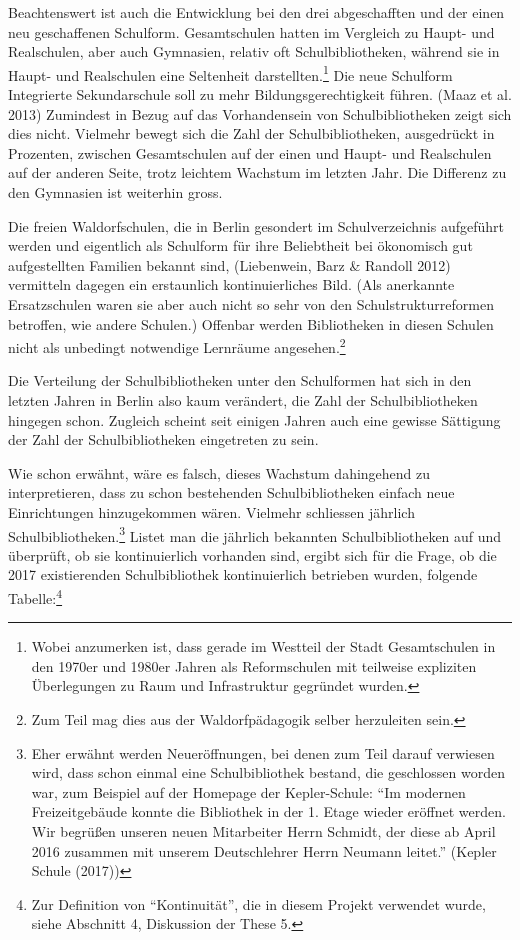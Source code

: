 \documentclass[a4paper,
fontsize=11pt,
oneside,
numbers=noperiodatend,
parskip=half-,
bibliography=totoc,
final
]{scrartcl}
\begin{document}
Beachtenswert ist auch die Entwicklung bei den drei abgeschafften und
der einen neu geschaffenen Schulform. Gesamtschulen hatten im Vergleich
zu Haupt- und Realschulen, aber auch Gymnasien, relativ oft
Schulbibliotheken, während sie in Haupt- und Realschulen eine Seltenheit
darstellten.\footnote{Wobei anzumerken ist, dass gerade im Westteil der
  Stadt Gesamtschulen in den 1970er und 1980er Jahren als Reformschulen
  mit teilweise expliziten Überlegungen zu Raum und Infrastruktur
  gegründet wurden.} Die neue Schulform Integrierte Sekundarschule soll
zu mehr Bildungsgerechtigkeit führen. (Maaz et al. 2013) Zumindest in
Bezug auf das Vorhandensein von Schulbibliotheken zeigt sich dies nicht.
Vielmehr bewegt sich die Zahl der Schulbibliotheken, ausgedrückt in
Prozenten, zwischen Gesamtschulen auf der einen und Haupt- und
Realschulen auf der anderen Seite, trotz leichtem Wachstum im letzten
Jahr. Die Differenz zu den Gymnasien ist weiterhin gross.

Die freien Waldorfschulen, die in Berlin gesondert im Schulverzeichnis
aufgeführt werden und eigentlich als Schulform für ihre Beliebtheit bei
ökonomisch gut aufgestellten Familien bekannt sind, (Liebenwein, Barz \&
Randoll 2012) vermitteln dagegen ein erstaunlich kontinuierliches Bild.
(Als anerkannte Ersatzschulen waren sie aber auch nicht so sehr von den
Schulstrukturreformen betroffen, wie andere Schulen.) Offenbar werden
Bibliotheken in diesen Schulen nicht als unbedingt notwendige Lernräume
angesehen.\footnote{Zum Teil mag dies aus der Waldorfpädagogik selber
  herzuleiten sein.}

Die Verteilung der Schulbibliotheken unter den Schulformen hat sich in
den letzten Jahren in Berlin also kaum verändert, die Zahl der
Schulbibliotheken hingegen schon. Zugleich scheint seit einigen Jahren
auch eine gewisse Sättigung der Zahl der Schulbibliotheken eingetreten
zu sein.

Wie schon erwähnt, wäre es falsch, dieses Wachstum dahingehend zu
interpretieren, dass zu schon bestehenden Schulbibliotheken einfach neue
Einrichtungen hinzugekommen wären. Vielmehr schliessen jährlich
Schulbibliotheken.\footnote{Eher erwähnt werden Neueröffnungen, bei
  denen zum Teil darauf verwiesen wird, dass schon einmal eine
  Schulbibliothek bestand, die geschlossen worden war, zum Beispiel auf
  der Homepage der Kepler-Schule: \enquote{Im modernen Freizeitgebäude
  konnte die Bibliothek in der 1. Etage wieder eröffnet werden. Wir
  begrüßen unseren neuen Mitarbeiter Herrn Schmidt, der diese ab April
  2016 zusammen mit unserem Deutschlehrer Herrn Neumann leitet.} (Kepler
  Schule (2017))} Listet man die jährlich bekannten Schulbibliotheken
auf und überprüft, ob sie kontinuierlich vorhanden sind, ergibt sich für
die Frage, ob die 2017 existierenden Schulbibliothek kontinuierlich
betrieben wurden, folgende Tabelle:\footnote{Zur Definition von
  \enquote{Kontinuität}, die in diesem Projekt verwendet wurde, siehe
  Abschnitt 4, Diskussion der These 5.}
\end{document}
